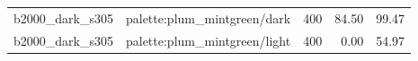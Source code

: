 \begin{longtable}{l>{\raggedright\arraybackslash}p{.42\linewidth}rrr}
b2000\_\allowbreak{}dark\_\allowbreak{}s305 & %
palette:plum\_\allowbreak{}mintgreen/dark & %
400 & %
84.50 & %
99.47 \\ %

b2000\_\allowbreak{}dark\_\allowbreak{}s305 & %
palette:plum\_\allowbreak{}mintgreen/light & %
400 & %
0.00 & %
54.97 \\ %


\end{longtable}

